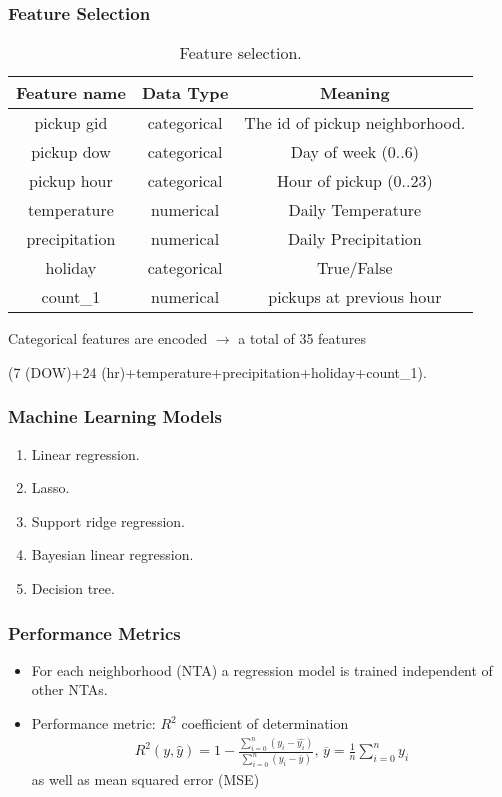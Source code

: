 \documentclass{beamer}
\begin{document}
\begin{frame}
  \frametitle{Feature Selection}
  \begin{table}[H]
    \renewcommand{\arraystretch}{1.3}
    \caption{Feature selection.}
    \label{table:feature}
    \centering
    \begin{tabular}{ | c | c | c |}
      \hline      
      Feature name & Data Type & Meaning \\
      \hline
      pickup gid & categorical & The id of pickup neighborhood. \\
      \hline
      pickup dow & categorical & Day of week (0..6) \\
      \hline  
      pickup hour & categorical & Hour of pickup (0..23)\\
      \hline
      temperature & numerical & Daily Temperature\\
      \hline
      precipitation & numerical & Daily Precipitation\\
      \hline
      holiday & categorical & True/False\\
      \hline 
      count\_1 & numerical & pickups at previous hour\\
      \hline
    \end{tabular}
  \end{table}
  Categorical features are encoded $\longrightarrow$ a total of 35 features
  
  (7 (DOW)+24 (hr)+temperature+precipitation+holiday+count\_1).
\end{frame}

\begin{frame}
  \frametitle{Machine Learning Models}
  \begin{enumerate}
    \item Linear regression.
    \item Lasso.
    \item Support ridge regression.
    \item Bayesian linear regression.
    \item Decision tree.
  \end{enumerate}
\end{frame}

\begin{frame}
  \frametitle{Performance Metrics}
  \begin{itemize}
    \item For each neighborhood (NTA) a regression model is trained independent
    of other NTAs.
    \item Performance metric: $R^2$ coefficient of determination
    \begin{align}
      R^2(y, \hat{y}) = 1 - \frac{\sum_{i=0}^{n} (y_i - \hat{y_i})}{\sum_{i =
      0}^{n} (y_i - \overline{y})},\,\overline{y} = \frac{1}{n}\sum_{i=0}^{n}y_i
    \end{align}
    as well as mean squared error (MSE)
  \end{itemize}
\end{frame}
\end{document}
